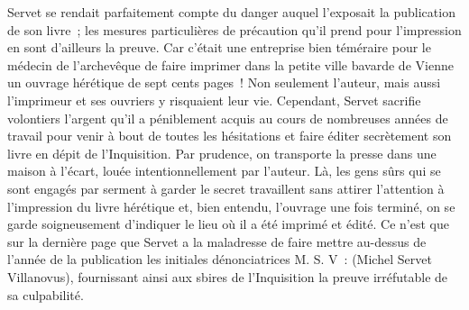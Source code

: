 \documentclass[french,twoside]{book} %
\newcommand{\astermono}{\medskip\centerline{\color{rubric}\large\selectfont{\syms ✻}}\medskip\par}%
\begin{document}
\astermono

\noindent Servet se rendait parfaitement compte du danger auquel l’exposait la publication de son livre ; les mesures particulières de précaution qu’il prend pour l’impression en sont d’ailleurs la preuve. Car c’était une entreprise bien téméraire pour le médecin de l’archevêque de faire imprimer dans la petite ville bavarde de Vienne un ouvrage hérétique de sept cents pages ! Non seulement l’auteur, mais aussi l’imprimeur et ses ouvriers y risquaient leur vie. Cependant, Servet sacrifie volontiers l’argent qu’il a péniblement acquis au cours de nombreuses années de travail pour venir à bout de toutes les hésitations et faire éditer secrètement son livre en dépit de l’Inquisition. Par prudence, on transporte la presse dans une maison à l’écart, louée intentionnellement par l’auteur. Là, les gens sûrs qui se sont engagés par serment à garder le secret travaillent sans attirer l’attention à l’impression du livre hérétique et, bien entendu, l’ouvrage une fois terminé, on se garde soigneusement d’indiquer le lieu où il a été imprimé et édité. Ce n’est que sur la dernière page que Servet a la maladresse de faire mettre au-dessus de l’année de la publication les initiales dénonciatrices M. S. V : (Michel Servet Villanovus), fournissant ainsi aux sbires de l’Inquisition la preuve irréfutable de sa culpabilité.\par

\astermono
\end{document}
